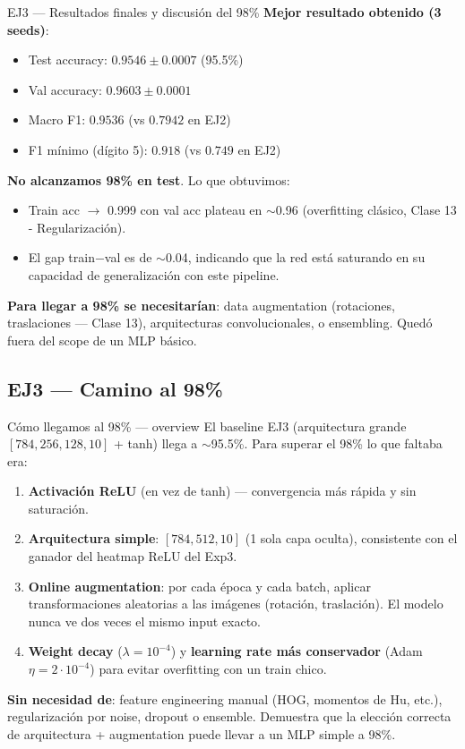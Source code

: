 \documentclass[aspectratio=169,10pt]{beamer}
\begin{document}
\begin{frame}{EJ3 — Resultados finales y discusión del 98\%}
  \textbf{Mejor resultado obtenido (3 seeds)}:
  \begin{itemize}
    \item Test accuracy: $0.9546 \pm 0.0007$ (95.5\%)
    \item Val accuracy:  $0.9603 \pm 0.0001$
    \item Macro F1:      $0.9536$ (vs $0.7942$ en EJ2)
    \item F1 mínimo (dígito 5): $0.918$ (vs $0.749$ en EJ2)
  \end{itemize}
  \vspace{0.4em}
  \textbf{No alcanzamos 98\% en test}. Lo que obtuvimos:
  \begin{itemize}
    \item Train acc $\to$ 0.999 con val acc plateau en $\sim$0.96
      (overfitting clásico, Clase 13 - Regularización).
    \item El gap train$-$val es de $\sim$0.04, indicando que la red
      está saturando en su capacidad de generalización con este pipeline.
  \end{itemize}
  \textbf{Para llegar a 98\% se necesitarían}: data augmentation
  (rotaciones, traslaciones — Clase 13), arquitecturas convolucionales,
  o ensembling. Quedó fuera del scope de un MLP básico.
\end{frame}

\subsection{EJ3 — Camino al 98\%}

\begin{frame}{Cómo llegamos al 98\% — overview}
  El baseline EJ3 (arquitectura grande $[784,256,128,10]$ + tanh)
  llega a $\sim$95.5\%. Para superar el 98\% lo que faltaba era:
  \begin{enumerate}\setlength\itemsep{0.2em}
    \item \textbf{Activación ReLU} (en vez de tanh) — convergencia más
      rápida y sin saturación.
    \item \textbf{Arquitectura simple}: $[784, 512, 10]$ (1 sola capa
      oculta), consistente con el ganador del heatmap ReLU del Exp3.
    \item \textbf{Online augmentation}: por cada época y cada batch,
      aplicar transformaciones aleatorias a las imágenes (rotación,
      traslación). El modelo nunca ve dos veces el mismo input exacto.
    \item \textbf{Weight decay} ($\lambda = 10^{-4}$) y
      \textbf{learning rate más conservador} (Adam $\eta = 2\!\cdot\!10^{-4}$)
      para evitar overfitting con un train chico.
  \end{enumerate}
  \vspace{0.4em}
  \textbf{Sin necesidad de}: feature engineering manual (HOG, momentos
  de Hu, etc.), regularización por noise, dropout o ensemble.
  Demuestra que la elección correcta de arquitectura + augmentation
  puede llevar a un MLP simple a 98\%.
\end{frame}
\end{document}
